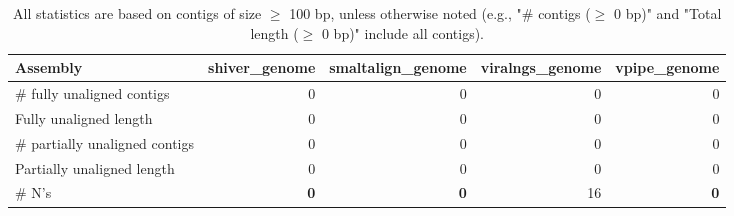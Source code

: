 \documentclass[12pt,a4paper]{article}
\begin{document}
\begin{table}[ht]
\begin{center}
\caption{All statistics are based on contigs of size $\geq$ 100 bp, unless otherwise noted (e.g., "\# contigs ($\geq$ 0 bp)" and "Total length ($\geq$ 0 bp)" include all contigs).}
\begin{tabular}{|l*{4}{|r}|}
\hline
Assembly & shiver\_genome & smaltalign\_genome & viralngs\_genome & vpipe\_genome \\ \hline
\# fully unaligned contigs & 0 & 0 & 0 & 0 \\ \hline
Fully unaligned length & 0 & 0 & 0 & 0 \\ \hline
\# partially unaligned contigs & 0 & 0 & 0 & 0 \\ \hline
Partially unaligned length & 0 & 0 & 0 & 0 \\ \hline
\# N's & {\bf 0} & {\bf 0} & 16 & {\bf 0} \\ \hline
\end{tabular}
\end{center}
\end{table}
\end{document}
